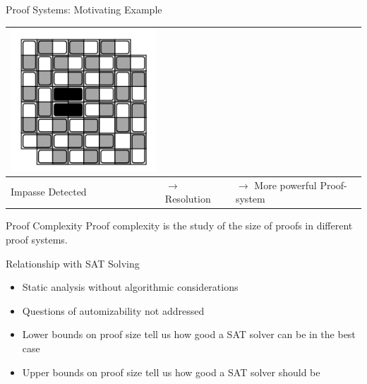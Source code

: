 \documentclass[t]{sdqbeamer}
\begin{document}
\begin{frame}{Proof Systems: Motivating Example}
\begin{example}
\begin{tabularx}{\linewidth}{XXX}
    \includegraphics[width=.8\linewidth]{figures/l12/mcb3.png}\\
    \hline
    Impasse Detected & $\rightarrow$ Resolution & $\rightarrow$ More powerful Proof-system
\end{tabularx}
\end{example}
\end{frame}


\begin{frame}{Proof Complexity}
Proof complexity is the study of the size of proofs in different proof systems.\\[1ex]
\begin{block}{Relationship with SAT Solving}
\begin{itemize}\setlength{\itemsep}{1ex}
\item Static analysis without algorithmic considerations
\item Questions of automizability not addressed
\item Lower bounds on proof size tell us how good a SAT solver can be in the best case 
\item Upper bounds on proof size tell us how good a SAT solver should be
\end{itemize}
\end{block}
\end{frame}
\end{document}
